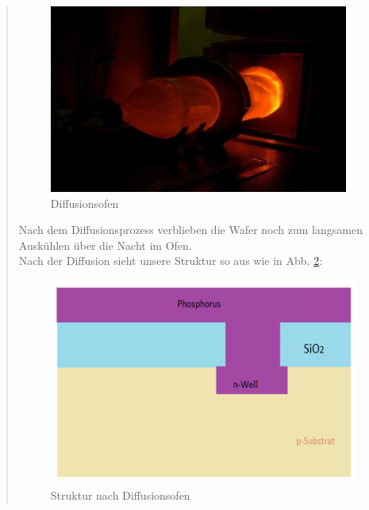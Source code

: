 \begin{quote}
		\vspace{2em}

    		\begin{figure}[H]
				\hspace{4 cm}
                \includegraphics[scale=0.75, trim = 0cm 0cm 0cm 0cm,clip]
                	{./HerstellungBilder/diffusionsofen.png}
                  \caption{Diffusionsofen}
                \label{fig:diff_ofen}
            \end{figure}

    	\vspace{2em}

		Nach dem Diffusionsprozess verblieben die Wafer noch zum langsamen
		Auskühlen über die Nacht im Ofen.\\

			Nach der Diffusion sieht unsere Struktur so aus wie in Abb.
			\ref{fig:nach_diff_ofen}:

			\vspace{2em}

    		\begin{figure}[H]
				\hspace{4 cm}
                \includegraphics[scale=0.7, trim = 0cm 0cm 0cm 0cm,clip]
                	{./HerstellungBilder/StrukturnachDiffusionsofen.png}
                  \caption{Struktur nach Diffusionsofen}
                \label{fig:nach_diff_ofen}
            \end{figure}


\end{quote}
